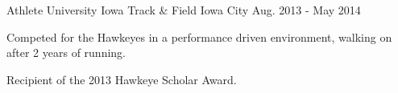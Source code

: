 \begin{cventries}
  \cventry
    {Athlete}
    {University Iowa Track \& Field}
    {Iowa City}
    {Aug. 2013 - May 2014}
    {
      \begin{cvitems}
        \item {Competed for the Hawkeyes in a performance driven environment, walking on after 2 years of running.}
        \item {Recipient of the 2013 Hawkeye Scholar Award.}
      \end{cvitems}
    }
\end{cventries}
